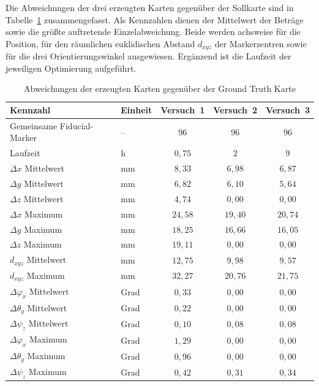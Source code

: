 Die Abweichungen der drei erzeugten Karten gegenüber der Sollkarte sind in Tabelle~\ref{tab:karten_evaluation} zusammengefasst.
Als Kennzahlen dienen der Mittelwert der Beträge sowie die größte auftretende Einzelabweichung.
Beide werden achsweise für die Position, für den räumlichen euklidischen Abstand $d_{xyz}$ der Markerzentren sowie für die drei Orientierungswinkel ausgewiesen.
Ergänzend ist die Laufzeit der jeweiligen Optimierung aufgeführt.
\begin{table}[htbp]
\centering
\begin{tabular}{llccc}
\toprule
\textbf{Kennzahl} & \textbf{Einheit} & \textbf{Versuch~1} & \textbf{Versuch~2} & \textbf{Versuch~3} \\
\midrule
Gemeinsame Fiducial-Marker & --   & $96$ & $96$ & $96$ \\
Laufzeit          & h    & $0{,}75$ & $2$ & $9$ \\
\midrule
$\Delta x$ Mittelwert & mm & $8{,}33$ & $6{,}98$ & $6{,}87$ \\
$\Delta y$ Mittelwert & mm & $6{,}82$ & $6{,}10$ & $5{,}64$ \\
$\Delta z$ Mittelwert & mm & $4{,}74$ & $0{,}00$ & $0{,}00$ \\
\midrule
$\Delta x$ Maximum & mm & $24{,}58$ & $19{,}40$ & $20{,}74$ \\
$\Delta y$ Maximum & mm & $18{,}25$ & $16{,}66$ & $16{,}05$ \\
$\Delta z$ Maximum & mm & $19{,}11$ & $0{,}00$  & $0{,}00$ \\
\midrule
$d_{xyz}$ Mittelwert & mm & $12{,}75$ & $9{,}98$  & $9{,}57$ \\
$d_{xyz}$ Maximum    & mm & $32{,}27$ & $20{,}76$ & $21{,}75$ \\
\midrule
$\Delta\varphi_x$ Mittelwert & Grad & $0{,}33$ & $0{,}00$ & $0{,}00$ \\
$\Delta\theta_y$ Mittelwert  & Grad & $0{,}22$ & $0{,}00$ & $0{,}00$ \\
$\Delta\psi_z$ Mittelwert    & Grad & $0{,}10$ & $0{,}08$ & $0{,}08$ \\
\midrule
$\Delta\varphi_x$ Maximum & Grad & $1{,}29$ & $0{,}00$ & $0{,}00$ \\
$\Delta\theta_y$ Maximum  & Grad & $0{,}96$ & $0{,}00$ & $0{,}00$ \\
$\Delta\psi_z$ Maximum    & Grad & $0{,}42$ & $0{,}31$ & $0{,}34$ \\
\bottomrule
\end{tabular}
\caption[Abweichungen der erzeugten Karten gegenüber der Ground Truth Karte]{Abweichungen der erzeugten Karten gegenüber der Ground Truth Karte}
\label{tab:karten_evaluation}
\end{table}
\FloatBarrier


